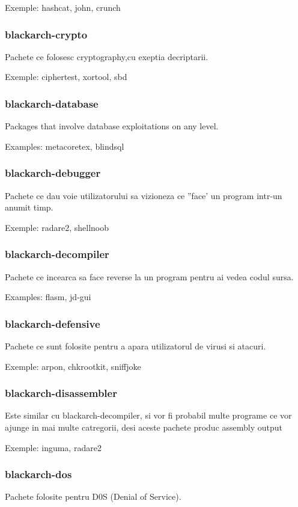 \documentclass[a4paper, oneside, 11pt]{book}
\begin{document}
Exemple: hashcat, john, crunch

\subsubsection{blackarch-crypto}
Pachete ce folosesc  cryptography,cu exeptia decriptarii.

Exemple: ciphertest, xortool, sbd

\subsubsection{blackarch-database}
Packages that involve database exploitations on any level.

Examples: metacoretex, blindsql

\subsubsection{blackarch-debugger}
Pachete ce dau voie utilizatorului sa vizioneza ce ''face' un program intr-un anumit timp.

Exemple: radare2, shellnoob

\subsubsection{blackarch-decompiler}
Pachete ce incearca sa face  reverse la un program pentru ai vedea codul sursa.

Examples: flasm, jd-gui

\subsubsection{blackarch-defensive}
Pachete ce sunt folosite pentru a apara utilizatorul de virusi si atacuri.

Exemple: arpon, chkrootkit, sniffjoke

\subsubsection{blackarch-disassembler}
Este similar cu blackarch-decompiler, si vor fi probabil multe programe ce vor ajunge in mai multe catregorii, desi aceste pachete produc assembly output

Exemple: inguma, radare2

\subsubsection{blackarch-dos}
Pachete folosite pentru D0S  (Denial of Service).
\end{document}
